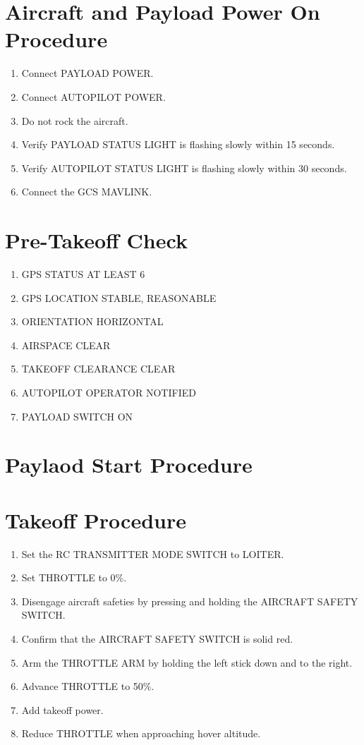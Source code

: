 \documentclass{report}
\begin{document}
	\section{Aircraft and Payload Power On Procedure}
		\begin{enumerate}
			\item Connect PAYLOAD POWER.
			\item Connect AUTOPILOT POWER.
			\item Do not rock the aircraft.
			\item Verify PAYLOAD STATUS LIGHT is flashing slowly within 15 seconds.
			\item Verify AUTOPILOT STATUS LIGHT is flashing slowly within 30 seconds.
			\item Connect the GCS MAVLINK.
		\end{enumerate}
	\section{Pre-Takeoff Check}
		\begin{enumerate}
			\item GPS STATUS \hrulefill AT LEAST 6
			\item GPS LOCATION \hrulefill STABLE, REASONABLE
			\item ORIENTATION \hrulefill HORIZONTAL
			\item AIRSPACE \hrulefill CLEAR
			\item TAKEOFF CLEARANCE \hrulefill CLEAR
			\item AUTOPILOT OPERATOR \hrulefill NOTIFIED
			\item PAYLOAD SWITCH \hrulefill ON
		\end{enumerate}
	\section{Paylaod Start Procedure}
	\section{Takeoff Procedure}
		\begin{enumerate}
			\item Set the RC TRANSMITTER MODE SWITCH to LOITER.
			\item Set THROTTLE to 0\%.
			\item Disengage aircraft safeties by pressing and holding the AIRCRAFT SAFETY SWITCH.
			\item Confirm that the AIRCRAFT SAFETY SWITCH is solid red.
			\item Arm the THROTTLE ARM by holding the left stick down and to the right.
			\item Advance THROTTLE to 50\%.
			\item Add takeoff power.
			\item Reduce THROTTLE when approaching hover altitude.
		\end{enumerate}
\end{document}
